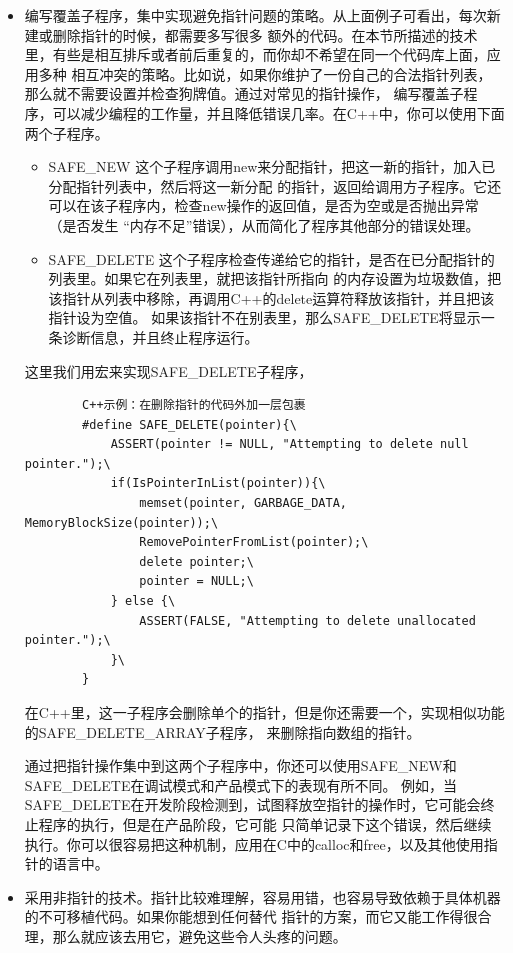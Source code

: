 \documentclass{article}
\begin{document}
\begin{itemize}
    \item 编写覆盖子程序，集中实现避免指针问题的策略。从上面例子可看出，每次新建或删除指针的时候，都需要多写很多
    额外的代码。在本节所描述的技术里，有些是相互排斥或者前后重复的，而你却不希望在同一个代码库上面，应用多种
    相互冲突的策略。比如说，如果你维护了一份自己的合法指针列表，那么就不需要设置并检查狗牌值。通过对常见的指针操作，
    编写覆盖子程序，可以减少编程的工作量，并且降低错误几率。在C++中，你可以使用下面两个子程序。
    \begin{itemize}
        \item SAFE\_NEW 这个子程序调用new来分配指针，把这一新的指针，加入已分配指针列表中，然后将这一新分配
        的指针，返回给调用方子程序。它还可以在该子程序内，检查new操作的返回值，是否为空或是否抛出异常（是否发生
        “内存不足”错误），从而简化了程序其他部分的错误处理。
        \item SAFE\_DELETE 这个子程序检查传递给它的指针，是否在已分配指针的列表里。如果它在列表里，就把该指针所指向
        的内存设置为垃圾数值，把该指针从列表中移除，再调用C++的delete运算符释放该指针，并且把该指针设为空值。
        如果该指针不在别表里，那么SAFE\_DELETE将显示一条诊断信息，并且终止程序运行。
    \end{itemize}
    这里我们用宏来实现SAFE\_DELETE子程序，
    \begin{lstlisting}
        C++示例：在删除指针的代码外加一层包裹
        #define SAFE_DELETE(pointer){\
            ASSERT(pointer != NULL, "Attempting to delete null pointer.");\
            if(IsPointerInList(pointer)){\
                memset(pointer, GARBAGE_DATA, MemoryBlockSize(pointer));\
                RemovePointerFromList(pointer);\
                delete pointer;\
                pointer = NULL;\
            } else {\
                ASSERT(FALSE, "Attempting to delete unallocated pointer.");\
            }\
        }
    \end{lstlisting}
    在C++里，这一子程序会删除单个的指针，但是你还需要一个，实现相似功能的SAFE\_DELETE\_ARRAY子程序，
    来删除指向数组的指针。
    \par
    通过把指针操作集中到这两个子程序中，你还可以使用SAFE\_NEW和
    SAFE\_DELETE在调试模式和产品模式下的表现有所不同。
    例如，当SAFE\_DELETE在开发阶段检测到，试图释放空指针的操作时，它可能会终止程序的执行，但是在产品阶段，它可能
    只简单记录下这个错误，然后继续执行。你可以很容易把这种机制，应用在C中的calloc和free，以及其他使用指针的语言中。
    \item 采用非指针的技术。指针比较难理解，容易用错，也容易导致依赖于具体机器的不可移植代码。如果你能想到任何替代
    指针的方案，而它又能工作得很合理，那么就应该去用它，避免这些令人头疼的问题。
\end{itemize}
\end{document}

